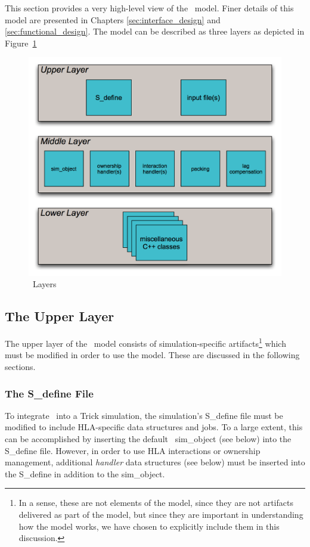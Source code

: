 This section provides a very high-level view of the \TrickHLA\ model.
Finer details of this model are presented in
Chapters \ref{sec:interface_design} and \ref{sec:functional_design}.
The model can be described as three layers
as depicted in Figure~\ref{fig:TrickHLA-layers}
%
\begin{figure}[h]
  \begin{center}
    \includegraphics[width=4.5in]{TrickHLA-layers.png}
  \end{center}
\caption{\TrickHLA\ Layers}
\label{fig:TrickHLA-layers}
\end{figure}
%

\subsection{The Upper Layer}

The upper layer of the \TrickHLA\ model consists of simulation-specific
artifacts\footnote{
In a sense, these are not elements of the model, since they are not artifacts delivered 
as part of the model, but since they are important in understanding how the model works, 
we have chosen to explicitly include them in this discussion.}
which must be modified in order to use the model.
These are discussed in the following sections.

\subsubsection{The {\ttfamily S\_define} File}

To integrate \TrickHLA\ into a Trick simulation, the simulation's {\ttfamily S\_define} file
must be modified to include HLA-specific data structures and jobs.
To a large extent, this can be accomplished by inserting the default
\TrickHLA\ {\ttfamily sim\_object} (see below) into the {\ttfamily S\_define} file.
However,
in order to use HLA interactions or ownership management, 
additional {\em handler} data structures (see below) must be inserted into the 
{\ttfamily S\_define} in addition to the {\ttfamily sim\_object}.

